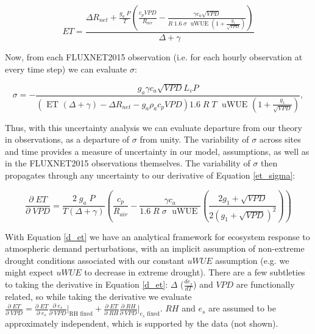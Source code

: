 \documentclass[draft,linenumbers]{agujournal}
\begin{document}
\begin{linenomath*}
  \begin{equation}
    ET = \frac{\Delta R_{net} + \frac{g_a\; P}{T} \left( \frac{ c_p VPD}{R_{air}} -  \frac{\gamma c_a \sqrt{VPD} }{ R \; 1.6\; \sigma \; \text{ uWUE } (1 + \frac{g_1}{\sqrt{VPD}})} \right) }{ \Delta + \gamma}
    \label{et_sigma}
  \end{equation}
\end{linenomath*}

Now, from each FLUXNET2015 observation (i.e. for each hourly observation at every time step) we can evaluate $\sigma$:

\begin{linenomath*}
  \begin{equation}
\sigma = - \frac{g_a \gamma c_a \sqrt{VPD} L_v P }{ \left(\text{ ET } ( \Delta + \gamma) - \Delta R_{net} - g_a \rho_a c_p VPD\right) 1.6 \; R\; T\; \text{ uWUE } (1 + \frac{g_1}{\sqrt{VPD}})},
    \label{sigma}
  \end{equation}
\end{linenomath*}

Thus, with this uncertainty analysis we can evaluate departure from our theory in observations, as a departure of $\sigma$ from unity. The variability of $\sigma$ across sites and time provides a measure of uncertainty in our model, assumptions, as well as in the FLUXNET2015 observations themselves. The variability of $\sigma$ then propagates through any uncertainty to our derivative of Equation \ref{et_sigma}:

\begin{linenomath*}
  \begin{equation}
    \frac{\partial \;  ET}{\partial \; VPD} = \frac{2\; g_a \; P}{T(\Delta + \gamma)}   \left(\frac{ c_p}{R_{air}} -  \frac{\gamma c_a }{1.6 \; R\; \sigma \; \text{ uWUE }} \left( \frac{2 g_1 + \sqrt{VPD}}{2 (g_1 + \sqrt{VPD})^2}\right) \right)
    \label{d_et}
  \end{equation}
\end{linenomath*}

With Equation \ref{d_et} we have an analytical framework for ecosystem response to atmospheric demand perturbations, with an implicit assumption of non-extreme drought conditions associated with our constant $uWUE$ assumption (e.g. we might expect $uWUE$ to decrease in extreme drought). There are a few subtleties to taking the derivative in Equation \ref{d_et}: $\Delta$ ($\frac{d e_{s}}{d T}$) and $VPD$ are functionally related, so while taking the derivative we evaluate $\frac{\partial \; ET}{\partial \; VPD} = \frac{\partial \; ET} {\partial \; e_s} \frac{\partial \; e_s}{\partial \; VPD} \Big|_{\text{RH fixed}} + \frac{\partial \; ET}{\partial \; RH} \frac{\partial \; RH}{\partial \; VPD} \Big|_{\text{$e_s$ fixed}}$. $RH$ and $e_s$ are assumed to be approximately independent, which is supported by the data (not shown). 
\end{document}
